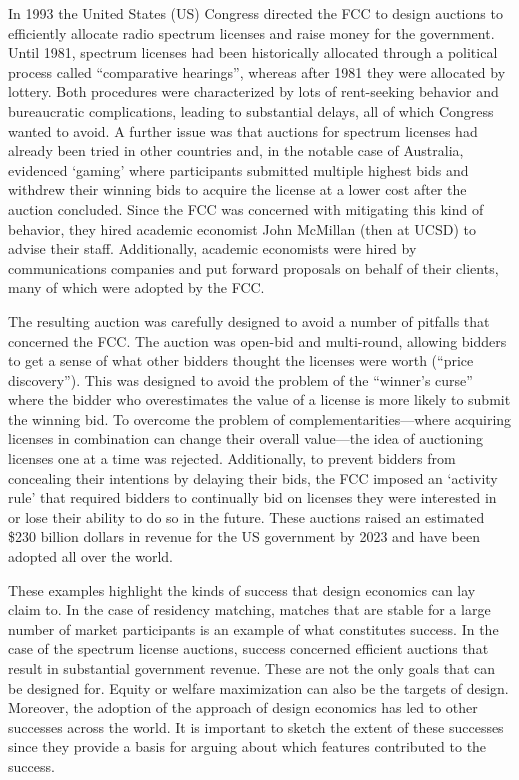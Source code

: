 \begin{example}
    In 1993 the United States (US) Congress directed the FCC to design auctions to efficiently allocate radio spectrum licenses and raise money for the government. Until 1981, spectrum licenses had been historically allocated through a political process called ``comparative hearings'', whereas after 1981 they were allocated by lottery. Both procedures were characterized by lots of rent-seeking behavior and bureaucratic complications, leading to substantial delays, all of which Congress wanted to avoid. A further issue was that auctions for spectrum licenses had already been tried in other countries and, in the notable case of Australia, evidenced `gaming' where participants submitted multiple highest bids and withdrew their winning bids to acquire the license at a lower cost after the auction concluded. Since the FCC was concerned with mitigating this kind of behavior, they hired academic economist John McMillan (then at UCSD) to advise their staff. Additionally, academic economists were hired by communications companies and put forward proposals on behalf of their clients, many of which were adopted by the FCC.

    The resulting auction was carefully designed to avoid a number of pitfalls that concerned the FCC. The auction was open-bid and multi-round, allowing bidders to get a sense of what other bidders thought the licenses were worth (``price discovery''). This was designed to avoid the problem of the ``winner's curse'' where the bidder who overestimates the value of a license is more likely to submit the winning bid. To overcome the problem of complementarities---where acquiring licenses in combination can change their overall value---the idea of auctioning licenses one at a time was rejected. Additionally, to prevent bidders from concealing their intentions by delaying their bids, the FCC imposed an `activity rule' that required bidders to continually bid on licenses they were interested in or lose their ability to do so in the future. These auctions raised an estimated \$230 billion dollars in revenue for the US government by 2023 \autocite{brookings2023} and have been adopted all over the world.
\end{example}

\noindent These examples highlight the kinds of success that design economics can lay claim to. In the case of residency matching, matches that are stable for a large number of market participants is an example of what constitutes success. In the case of the spectrum license auctions, success concerned efficient auctions that result in substantial government revenue. These are not the only goals that can be designed for. Equity or welfare maximization can also be the targets of design. Moreover, the adoption of the approach of design economics has led to other successes across the world. It is important to sketch the extent of these successes since they provide a basis for arguing about which features contributed to the success.

